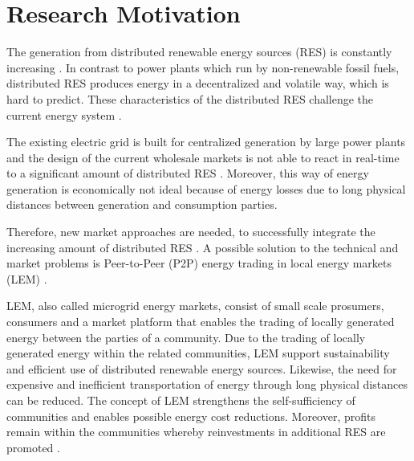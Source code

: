 \section{Research Motivation}
\label{sec:research_motivation}

The generation from distributed renewable energy sources (RES) is constantly increasing . 
In contrast to power plants which run by non-renewable fossil fuels, distributed RES produces energy in a decentralized and volatile way, which is hard to predict. 
These characteristics of the distributed RES challenge the current energy system .

The existing electric grid is built for centralized generation by large power plants and the design of the current wholesale markets
is not able to react in real-time to a significant amount of distributed RES  . 
Moreover, this way of energy generation is economically not ideal because of energy losses due to long physical
distances between generation and consumption parties. 

Therefore, new market approaches are needed, to successfully integrate the increasing amount of distributed RES . 
A possible solution to the technical and market problems is Peer-to-Peer (P2P) energy trading in local energy markets (LEM) . 

LEM, also called microgrid energy markets, consist of small scale prosumers, consumers and a market platform that enables the trading 
of locally generated energy between the parties of a community.
Due to the trading of locally generated energy within the related communities,
LEM support sustainability and efficient use of distributed renewable energy sources.
Likewise, the need for expensive and inefficient transportation of energy through long physical 
distances can be reduced. The concept of LEM strengthens the self-sufficiency of communities and 
enables possible energy cost reductions. Moreover, profits remain within the communities 
whereby reinvestments in additional RES are promoted . 

